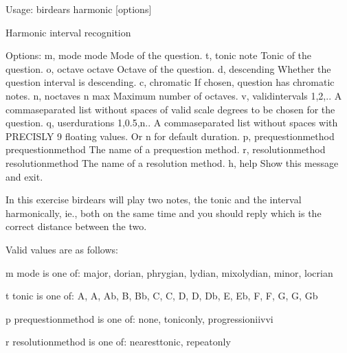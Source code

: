 \documentclass[letterpaper,10pt,english]{sphinxmanual}
\begin{document}
\begin{sphinxVerbatim}[commandchars=\\\{\}]
Usage: birdears harmonic [options]

  Harmonic interval recognition

Options:
  \PYGZhy{}m, \PYGZhy{}\PYGZhy{}mode \PYGZlt{}mode\PYGZgt{}               Mode of the question.
  \PYGZhy{}t, \PYGZhy{}\PYGZhy{}tonic \PYGZlt{}note\PYGZgt{}              Tonic of the question.
  \PYGZhy{}o, \PYGZhy{}\PYGZhy{}octave \PYGZlt{}octave\PYGZgt{}           Octave of the question.
  \PYGZhy{}d, \PYGZhy{}\PYGZhy{}descending                Whether the question interval is descending.
  \PYGZhy{}c, \PYGZhy{}\PYGZhy{}chromatic                 If chosen, question has chromatic notes.
  \PYGZhy{}n, \PYGZhy{}\PYGZhy{}n\PYGZus{}octaves \PYGZlt{}n max\PYGZgt{}         Maximum number of octaves.
  \PYGZhy{}v, \PYGZhy{}\PYGZhy{}valid\PYGZus{}intervals \PYGZlt{}1,2,..\PYGZgt{}  A comma\PYGZhy{}separated list without spaces
                                  of valid scale degrees to be chosen for the
                                  question.
  \PYGZhy{}q, \PYGZhy{}\PYGZhy{}user\PYGZus{}durations \PYGZlt{}1,0.5,n..\PYGZgt{}
                                  A comma\PYGZhy{}separated list without
                                  spaces with PRECISLY 9 floating values. Or
                                  \PYGZsq{}n\PYGZsq{} for default              duration.
  \PYGZhy{}p, \PYGZhy{}\PYGZhy{}prequestion\PYGZus{}method \PYGZlt{}prequestion\PYGZus{}method\PYGZgt{}
                                  The name of a pre\PYGZhy{}question method.
  \PYGZhy{}r, \PYGZhy{}\PYGZhy{}resolution\PYGZus{}method \PYGZlt{}resolution\PYGZus{}method\PYGZgt{}
                                  The name of a resolution method.
  \PYGZhy{}h, \PYGZhy{}\PYGZhy{}help                      Show this message and exit.

  In this exercise birdears will play two notes, the tonic and the interval
  harmonically, ie., both on the same time and you should reply which is the
  correct distance between the two.

  Valid values are as follows:

  \PYGZhy{}m \PYGZlt{}mode\PYGZgt{} is one of: major, dorian, phrygian, lydian, mixolydian, minor,
  locrian

  \PYGZhy{}t \PYGZlt{}tonic\PYGZgt{} is one of: A, A\PYGZsh{}, Ab, B, Bb, C, C\PYGZsh{}, D, D\PYGZsh{}, Db, E, Eb, F, F\PYGZsh{}, G,
  G\PYGZsh{}, Gb

  \PYGZhy{}p \PYGZlt{}prequestion\PYGZus{}method\PYGZgt{} is one of: none, tonic\PYGZus{}only, progression\PYGZus{}i\PYGZus{}iv\PYGZus{}v\PYGZus{}i

  \PYGZhy{}r \PYGZlt{}resolution\PYGZus{}method\PYGZgt{} is one of: nearest\PYGZus{}tonic, repeat\PYGZus{}only
\end{sphinxVerbatim}
\end{document}

